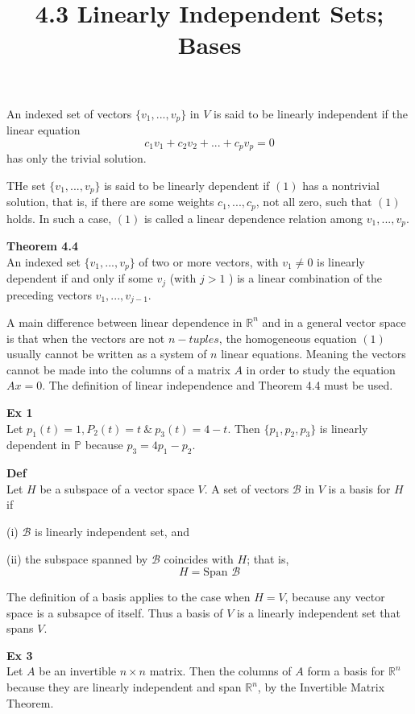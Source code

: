 \documentclass{article}
\title{4.3 Linearly Independent Sets; Bases}
\begin{document}
  \maketitle
  An indexed set of vectors $ \{ v_1,...,v_p \} $ in $ V $ is said to be linearly independent if the linear equation
  \[
    c_1v_1+c_2v_2+...+c_pv_p=0
  \]
  has only the trivial solution.

  THe set $ \{ v_1,...,v_p \} $ is said to be linearly dependent if $ (1) $ has a nontrivial solution, that is, if there are some weights $ c_1,...,c_p $, not all zero, such that $ (1) $ holds. In such a case, $ (1) $ is called a linear dependence relation among $ v_1,...,v_p $.

  \textbf{Theorem 4.4}\\
  An indexed set $ \{ v_1,...,v_p \} $ of two or more vectors, with $ v_1 \neq 0 $ is linearly dependent if and only if some $ v_j $ (with $ j>1 $ ) is a linear combination of the preceding vectors $ v_1,...,v_{j-1} $.

  A main difference between linear dependence in $ \mathbb{R}^{n} $ and in a general vector space is that when the vectors are not $ n-tuples $, the homogeneous equation $ (1) $ usually cannot be written as a system of $ n $ linear equations. Meaning the vectors cannot be made into the columns of a matrix $ A $ in order to study the equation $ Ax=0 $. The definition of linear independence and Theorem 4.4 must be used.

  \textbf{Ex 1}\\
  Let $ p_1(t)=1, P_2(t)=t ~\&~ p_3(t)=4-t$. Then $ \{ p_1,p_2,p_3 \} $ is linearly dependent in $ \mathbb{P} $ because $ p_3=4p_1-p_2 $.

  \textbf{Def}\\
  Let $ H $ be a subspace of a vector space $ V $. A set of vectors $ \mathcal{B} $ in $ V $ is a basis for $ H $ if

  (i) $ \mathcal{B} $ is linearly independent set, and

  (ii) the subspace spanned by $ \mathcal{B} $ coincides with $ H $; that is,
  \[
    H=\text{Span }\mathcal{B}
  \]
  
  The definition of a basis applies to the case when $ H=V $, because any vector space is a subsapce of itself. Thus a basis of $ V $ is a linearly independent set that spans $ V $. 

  \textbf{Ex 3}\\
  Let $ A $ be an invertible $ n \times n $ matrix. Then the columns of $ A $ form a basis for $ \mathbb{R}^{n} $ because they are linearly independent and span $ \mathbb{R}^{n} $, by the Invertible Matrix Theorem.
\end{document}
